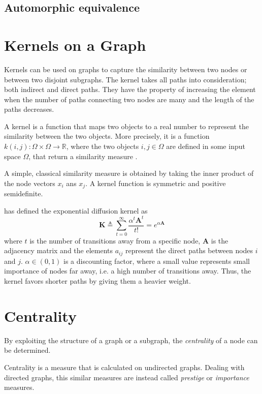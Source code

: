 \subsection{Automorphic equivalence}


\section{Kernels on a Graph}

Kernels can be used on graphs to capture the similarity between two nodes or between two disjoint subgraphs. The kernel takes all paths into consideration; both indirect and direct paths. They have the property of increasing the element when the number of paths connecting two nodes are many and the length of the paths decreases. 

A kernel is a function that maps two objects to a real number to represent the similarity between the two objects. More precisely, it is a function $k(i,j):\Omega \times \Omega \rightarrow \mathbb{R}$, where the two objects $i,j\in \Omega$ are defined in some input space $\Omega$, that return a similarity measure \cite{fouss2016algorithms}. 

A simple, classical similarity measure is obtained by taking the inner product of the node vectors $x_i$ ans $x_j$. A kernel function is symmetric and positive semidefinite. 

\cite{gartner2008kernels}

\citet{kondor2002diffusionkernels} has defined the exponential diffusion kernel as
\begin{equation}
    \textbf{K} \triangleq \sum_{t=0}^{\infty} \frac{\alpha^t \textbf{A}^t}{t!} = e^{\alpha \textbf{A}}
\end{equation}
where $t$ is the number of transitions away from a specific node, $\textbf{A}$ is the adjacency matrix and the elements $a_{ij}$ represent the direct paths between nodes $i$ and $j$. $\alpha \in (0,1)$ is a discounting factor, where a small value represents small importance of nodes far away, i.e. a high number of transitions away. Thus, the kernel favors shorter paths by giving them a heavier weight.

\section{Centrality}
By exploiting the structure of a graph or a subgraph, the \textit{centrality} of a node can be determined. 

Centrality is a measure that is calculated on undirected graphs. Dealing with directed graphs, this similar measures are instead called \textit{prestige} or \textit{importance} measures. \cite{fouss2016algorithms}


